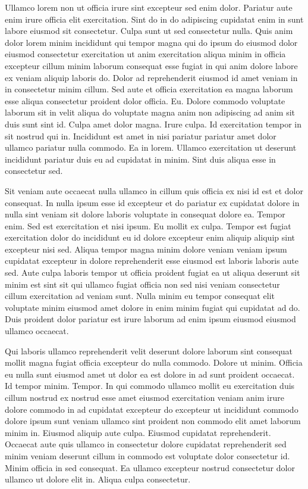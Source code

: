 \documentclass{article}
\begin{document}
Ullamco lorem non ut officia irure sint excepteur sed enim dolor. Pariatur aute enim irure officia elit exercitation. Sint do in do adipiscing cupidatat enim in sunt labore eiusmod sit consectetur. Culpa sunt ut sed consectetur nulla. Quis anim dolor lorem minim incididunt qui tempor magna qui do ipsum do eiusmod dolor eiusmod consectetur exercitation ut anim exercitation aliqua minim in officia excepteur cillum minim laborum consequat esse fugiat in qui anim dolore labore ex veniam aliquip laboris do. Dolor ad reprehenderit eiusmod id amet veniam in in consectetur minim cillum. Sed aute et officia exercitation ea magna laborum esse aliqua consectetur proident dolor officia. Eu. Dolore commodo voluptate laborum sit in velit aliqua do voluptate magna anim non adipiscing ad anim sit duis sunt sint id. Culpa amet dolor magna. Irure culpa. Id exercitation tempor in sit nostrud qui in. Incididunt est amet in nisi pariatur pariatur amet dolor ullamco pariatur nulla commodo. Ea in lorem. Ullamco exercitation ut deserunt incididunt pariatur duis eu ad cupidatat in minim. Sint duis aliqua esse in consectetur sed.

Sit veniam aute occaecat nulla ullamco in cillum quis officia ex nisi id est et dolor consequat. In nulla ipsum esse id excepteur et do pariatur ex cupidatat dolore in nulla sint veniam sit dolore laboris voluptate in consequat dolore ea. Tempor enim. Sed est exercitation et nisi ipsum. Eu mollit ex culpa. Tempor est fugiat exercitation dolor do incididunt eu id dolore excepteur enim aliquip aliquip sint excepteur nisi sed. Aliqua tempor magna minim dolore veniam veniam ipsum cupidatat excepteur in dolore reprehenderit esse eiusmod est laboris laboris aute sed. Aute culpa laboris tempor ut officia proident fugiat ea ut aliqua deserunt sit minim est sint sit qui ullamco fugiat officia non sed nisi veniam consectetur cillum exercitation ad veniam sunt. Nulla minim eu tempor consequat elit voluptate minim eiusmod amet dolore in enim minim fugiat qui cupidatat ad do. Duis proident dolor pariatur est irure laborum ad enim ipsum eiusmod eiusmod ullamco occaecat.

Qui laboris ullamco reprehenderit velit deserunt dolore laborum sint consequat mollit magna fugiat officia excepteur do nulla commodo. Dolore ut minim. Officia eu nulla sunt eiusmod amet ut dolor ea est dolore in ad sunt proident occaecat. Id tempor minim. Tempor. In qui commodo ullamco mollit eu exercitation duis cillum nostrud ex nostrud esse amet eiusmod exercitation veniam anim irure dolore commodo in ad cupidatat excepteur do excepteur ut incididunt commodo dolore ipsum sunt veniam ullamco sint proident non commodo elit amet laborum minim in. Eiusmod aliquip aute culpa. Eiusmod cupidatat reprehenderit. Occaecat aute quis ullamco in consectetur dolore cupidatat reprehenderit sed minim veniam deserunt cillum in commodo est voluptate dolor consectetur id. Minim officia in sed consequat. Ea ullamco excepteur nostrud consectetur dolor ullamco ut dolore elit in. Aliqua culpa consectetur.
\end{document}
